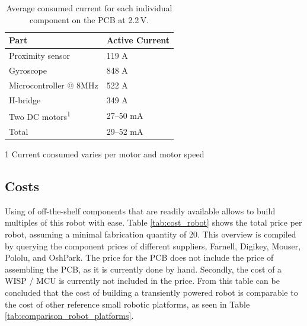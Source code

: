 \begin{table}[t]
	\centering
	\begin{threeparttable}
		\caption{Average consumed current for each individual component on the PCB at 2.2\,V.}
		\label{tab:avg_cur_comp}
		\begin{tabular}{|l|l|} 
			\hline
			Part & Active Current \\
			\hline\hline
			Proximity sensor & 119 \textmu A \\
			Gyroscope & 848 \textmu A\\	
			Microcontroller @ 8MHz & 522 \textmu A\\
			H-bridge & 349 \textmu A \\
			Two DC motors\textsuperscript{1} & 27--50 mA  \\
			\hline \hline
			Total & 29--52 mA \\
			\hline
		\end{tabular}
		\begin{tablenotes}
		\small
		\item [1] Current consumed varies per motor and motor speed
		\end{tablenotes}
	\end{threeparttable}
\end{table}

\subsection{Costs}

Using of off-the-shelf components that are readily available allows to build multiples of this robot with ease.
Table \ref{tab:cost_robot} shows the total price per robot, assuming a minimal fabrication quantity of 20.
This overview is compiled by querying the component prices of different suppliers, Farnell, Digikey, Mouser, Pololu, and OshPark.
The price for the PCB does not include the price of assembling the PCB, as it is currently done by hand.
Secondly, the cost of a WISP / MCU is currently not included in the price.
From this table can be concluded that the cost of building a transiently powered robot is comparable to the cost of other reference small robotic platforms, as seen in Table \ref{tab:comparison_robot_platforms}.


